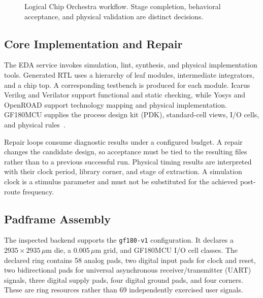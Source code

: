 ﻿\documentclass[conference,letterpaper]{IEEEtran}
\begin{document}
\begin{figure}[t]
\centering
{}
\caption{Logical Chip Orchestra workflow. Stage completion, behavioral acceptance, and physical validation are distinct decisions.}
\label{fig:flow}
\end{figure}

\subsection{Core Implementation and Repair}
The EDA service invokes simulation, lint, synthesis, and physical implementation tools. Generated RTL uses a hierarchy of leaf modules, intermediate integrators, and a chip top. A corresponding testbench is produced for each module. Icarus Verilog and Verilator support functional and static checking, while Yosys and OpenROAD support technology mapping and physical implementation. GF180MCU supplies the process design kit (PDK), standard-cell views, I/O cells, and physical rules~\cite{gf180}.

Repair loops consume diagnostic results under a configured budget. A repair changes the candidate design, so acceptance must be tied to the resulting files rather than to a previous successful run. Physical timing results are interpreted with their clock period, library corner, and stage of extraction. A simulation clock is a stimulus parameter and must not be substituted for the achieved post-route frequency.

\subsection{Padframe Assembly}
The inspected backend supports the \texttt{gf180-v1} configuration. It declares a $2935\times2935\,\mu$m die, a $0.005\,\mu$m grid, and GF180MCU I/O cell classes. The declared ring contains 58 analog pads, two digital input pads for clock and reset, two bidirectional pads for universal asynchronous receiver/transmitter (UART) signals, three digital supply pads, four digital ground pads, and four corners. These are ring resources rather than 69 independently exercised user signals.
\end{document}
